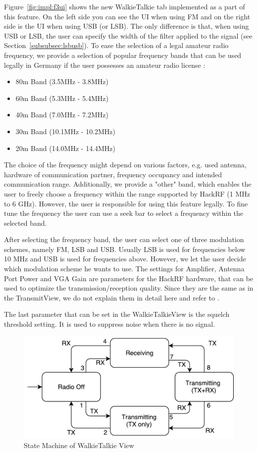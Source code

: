 Figure~\ref{fig:impl:f3ui} shows the new WalkieTalkie tab implemented as a part of this feature. On the left side you can see the UI when using FM and on the right side is the UI when using USB (or LSB). The only difference is that, when using USB or LSB, the user can specify the width of the filter applied to the signal (see Section~\ref{subsubsec:lsbusb}). To ease the selection of a legal amateur radio frequency, we provide a selection of popular frequency bands that can be used legally in Germany if the user possesses an amateur radio license \cite{afuv}: 
\begin{itemize}
	\item 80m Band (3.5MHz - 3.8MHz)
	\item 60m Band (5.3MHz - 5.4MHz)
	\item 40m Band (7.0MHz - 7.2MHz)
	\item 30m Band (10.1MHz - 10.2MHz)
	\item 20m Band (14.0MHz - 14.4MHz)
\end{itemize}

The choice of the frequency might depend on various factors, e.g. used antenna, hardware of communication partner, frequency occupancy and intended communication range. 
Additionally, we provide a "other" band, which enables the user to freely choose a frequency within the range supported by HackRF (1 MHz to 6 GHz). However, the user is responsible for using this feature legally. To fine tune the frequency the user can use a seek bar to select a frequency within the selected band. 

After selecting the frequency band, the user can select one of three modulation schemes, namely FM, LSB and USB. Usually LSB is used for frequencies below 10 MHz and USB is used for frequencies above. However, we let the user decide which modulation scheme he wants to use.
The settings for Amplifier, Antenna Port Power and VGA Gain are parameters for the HackRF hardware, that can be used to optimize the transmission/reception quality. Since they are the same as in the TransmitView, we do not explain them in detail here and refer to \cite{Mantz2016}. 

The last parameter that can be set in the WalkieTalkieView is the squelch threshold setting. It is used to suppress noise when there is no signal. 
\begin{figure}
	\centering
	\includegraphics[width=0.8\linewidth]{gfx/walkietalkieview_fsm.pdf}
	\caption{State Machine of WalkieTalkie View}
	\label{fig:impl:f3fsa}
\end{figure}

